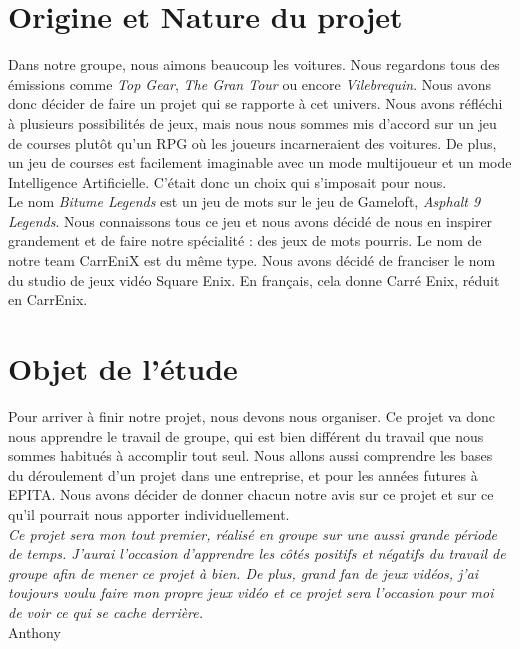 \documentclass[11pt,a4paper]{article}
\begin{document}
\clearpage

\section{Origine et Nature du projet}
  Dans notre groupe, nous aimons beaucoup les voitures. Nous regardons tous des émissions comme 
  \textit{Top Gear}, \textit{The Gran Tour} ou encore \textit{Vilebrequin}. Nous avons donc décider de faire
  un projet qui se rapporte à cet univers. Nous avons réfléchi à plusieurs possibilités de jeux, mais nous
  nous sommes mis d'accord sur un jeu de courses plutôt qu'un RPG où les joueurs incarneraient des voitures.
  De plus, un jeu de courses est facilement imaginable avec un mode multijoueur et un mode Intelligence 
  Artificielle. C'était donc un choix qui s'imposait pour nous.\\
  \indent Le nom \textit{Bitume Legends} est un jeu de mots sur le jeu de Gameloft, \textit{Asphalt 9 Legends}.
  Nous connaissons tous ce jeu et nous avons décidé de nous en inspirer grandement et de faire notre 
  spécialité : des jeux de mots pourris. Le nom de notre team CarrEniX est du même type. Nous avons décidé
  de franciser le nom du studio de jeux vidéo Square Enix. En français, cela donne Carré Enix, réduit en
  CarrEnix.
\clearpage

\section{Objet de l'étude}
  Pour arriver à finir notre projet, nous devons nous organiser.
  Ce projet va donc nous apprendre le travail de groupe, qui est bien différent du travail que nous sommes habitués
  à accomplir tout seul. Nous allons aussi comprendre les bases du déroulement d'un projet dans une entreprise, 
  et pour les années futures à EPITA. Nous avons décider de donner chacun notre avis sur ce projet et sur ce 
  qu'il pourrait nous apporter individuellement.\\

  \textit{Ce projet sera mon tout premier, réalisé en groupe sur une aussi grande période de temps. 
    J'aurai l'occasion d'apprendre les côtés positifs et négatifs du travail de groupe afin de mener ce 
    projet à bien. De plus, grand fan de jeux vidéos, j'ai toujours voulu faire mon propre jeux vidéo et ce 
    projet sera l'occasion pour moi de voir ce qui se cache derrière.} \\
  \indent Anthony\\
\end{document}
